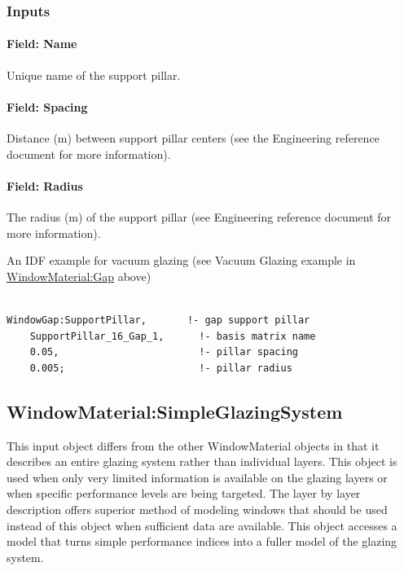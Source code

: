 \subsubsection{Inputs}\label{inputs-20-006}

\paragraph{Field: Name}\label{field-name-14-009}

Unique name of the support pillar.

\paragraph{Field: Spacing}\label{field-spacing}

Distance (m) between support pillar centers (see the Engineering reference document for more information).

\paragraph{Field: Radius}\label{field-radius}

The radius (m) of the support pillar (see Engineering reference document for more information).

An IDF example for vacuum glazing (see Vacuum Glazing example in \hyperref[windowmaterialgap]{WindowMaterial:Gap} above)

\begin{lstlisting}

WindowGap:SupportPillar,       !- gap support pillar
    SupportPillar_16_Gap_1,      !- basis matrix name
    0.05,                        !- pillar spacing
    0.005;                       !- pillar radius
\end{lstlisting}

\subsection{WindowMaterial:SimpleGlazingSystem}\label{windowmaterialsimpleglazingsystem}


This input object differs from the other WindowMaterial objects in that it describes an entire glazing system rather than individual layers. This object is used when only very limited information is available on the glazing layers or when specific performance levels are being targeted. The layer by layer description offers superior method of modeling windows that should be used instead of this object when sufficient data are available. This object accesses a model that turns simple performance indices into a fuller model of the glazing system.

